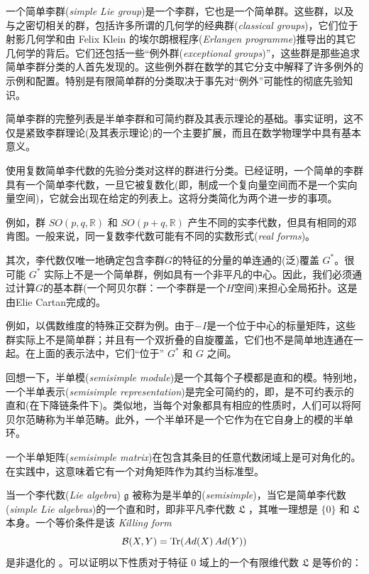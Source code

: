\documentclass[11pt,fontset=founder]{ctexart}
\begin{document}
一个简单李群(\textit{simple Lie group})是一个李群，它也是一个简单群。这些群，以及与之密切相关的群，包括许多所谓的几何学的经典群(\emph{classical groups})，它们位于射影几何学和由 Felix Klein 的埃尔朗根程序(\textit{Erlangen programme})推导出的其它几何学的背后。它们还包括一些“例外群(\emph{exceptional groups})”，这些群是那些追求简单李群分类的人首先发现的。这些例外群在数学的其它分支中解释了许多例外的示例和配置。特别是有限简单群的分类取决于事先对“例外”可能性的彻底先验知识。

简单李群的完整列表是半单李群和可简约群及其表示理论的基础。事实证明，这不仅是紧致李群理论(及其表示理论)的一个主要扩展，而且在数学物理学中具有基本意义。

使用复数简单李代数的先验分类对这样的群进行分类。已经证明，一个简单的李群具有一个简单李代数，一旦它被复数化(即，制成一个复向量空间而不是一个实向量空间)，它就会出现在给定的列表上。这将分类简化为两个进一步的事项。

例如，群 $SO(p,q,\mathbb{R})$ 和 $SO(p+q,\mathbb{R})$ 产生不同的实李代数，但具有相同的邓肯图。一般来说，同一复数李代数可能有不同的实数形式(\emph{real forms})。

其次，李代数仅唯一地确定包含李群$G$的特征的分量的单连通的(泛)覆盖 $G^{\ast }$。很可能 $G^{\ast }$ 实际上不是一个简单群，例如具有一个非平凡的中心。因此，我们必须通过计算$G$的基本群(一个阿贝尔群：一个李群是一个$H$空间)来担心全局拓扑。这是由Elie Cartan完成的。

例如，以偶数维度的特殊正交群为例。由于$-I$是一个位于中心的标量矩阵，这些群实际上不是简单群；并且有一个双折叠的自旋覆盖，它们也不是简单地连通在一起。在上面的表示法中，它们“位于” $G^{\ast }$ 和 $G$ 之间。

回想一下，半单模(\emph{semisimple module})是一个其每个子模都是直和的模。特别地，一个半单表示(\textit{semisimple representation})是完全可简约的，即，是不可约表示的直和(在下降链条件下)。类似地，当每个对象都具有相应的性质时，人们可以将阿贝尔范畴称为半单范畴。此外，一个半单环是一个它作为在它自身上的模的半单环。

一个半单矩阵(\emph{semisimple matrix})在包含其条目的任意代数闭域上是可对角化的。在实践中，这意味着它有一个对角矩阵作为其约当标准型。

当一个李代数(\emph{Lie algebra}) $\mathfrak{g}$ 被称为是半单的(\emph{semisimple})，当它是简单李代数(\emph{simple Lie algebras})的一个直和时，即非平凡李代数 $\mathfrak{L}$ ，其唯一理想是 $\{0\}$ 和 $\mathfrak{L}$ 本身。一个等价条件是该 \textit{Killing form}
\begin{equation*}
\mathcal{B}(X,Y)=\mathop{\rm Tr}(Ad(X)\,Ad(Y))
\end{equation*}
是非退化的 \cite{Schafer}。可以证明以下性质对于特征 $0$ 域上的一个有限维代数 $\mathfrak{L}$ 是等价的：
\end{document}
